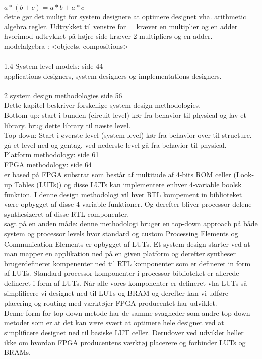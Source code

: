 $a*(b+c) = a*b+a*c$\\
dette gør det muligt for system designere at optimere designet vha. arithmetic algebra regler. Udtrykket til venstre for = kræver en multiplier og en adder hvorimod udtrykket på højre side kræver 2 multipliers og en adder.\\
modelalgebra : <objects, compositions>\\
\\
1.4 System-level models: side 44\\
applications designers, system designers og implementations designers.\\
\\
2 system design methodologies side 56\\
Dette kapitel beskriver forskellige system design methodologies.\\
Bottom-up: start i bunden (circuit level) kør fra behavior til physical og lav et library. brug dette library til næste level.\\
Top-down: Start i øverste level (system level) kør fra behavior over til structure. gå et level ned og gentag. ved nederste level gå fra behavior til physical.\\
Platform methodology: side 61\\
FPGA methodology: side 64\\
er based på FPGA substrat som består af multitude af 4-bits ROM celler (Look-up Tables (LUTs)) og disse LUTs kan implementere enhver 4-variable boolsk funktion. I denne design methodologi vil hver RTL kompement in biblioteket være opbygget af disse 4-variable funktioner. Og derefter bliver processor delene synthesizeret af disse RTL componenter.\\
sagt på en anden måde: denne methodologi bruger en top-down approach på både system og processor levels hvor standard og custom Processing Elements og Communication Elements er opbygget af LUTs. Et system design starter ved at man mapper en applikation ned på en given platform og derefter syntheser brugerdefineret kompenenter ned til RTL komponenter som er defineret in form af LUTs. Standard processor komponenter i processor biblioteket er allerede defineret i form af LUTs. Når alle vores komponenter er defineret vha LUTs så simplificere vi designet ned til LUTs og BRAM og derefter kan vi udføre placering og routing med værktøjer FPGA producentet har udviklet.\\
Denne form for top-down metode har de samme svagheder som andre top-down metoder som er at det kan være svært at optimere hele designet ved at simplificere designet ned til basiske LUT celler. Derudover ved udvikler heller ikke om hvordan FPGA producentens værktøj placerere og forbinder LUTs og BRAMs.\\


\color{black}






